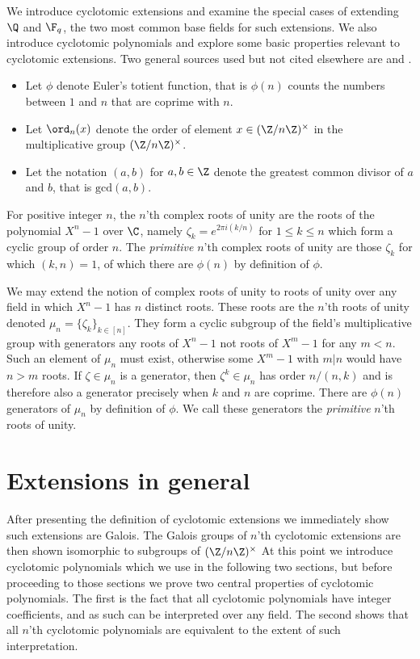 
We introduce cyclotomic extensions and examine the special cases of extending $\Q$ and $\F_q$, the two most common base fields for such extensions.
We also introduce cyclotomic polynomials and explore some basic properties relevant to cyclotomic extensions.
Two general sources used but not cited elsewhere are \cite{Mor96} and \cite{Conrad}.

\begin{itemize}
    \item
    Let $\phi$ denote Euler's totient function, that is $\phi(n)$ counts the numbers between $1$ and $n$ that are coprime with $n$.
    \item
    Let $\ord_n(x)$ denote the order of element $x\in(\Z/n\Z)^\times$ in the multiplicative group $(\Z/n\Z)^\times$.
    \item
    Let the notation $(a,b)$ for $a,b\in\Z$ denote the greatest common divisor of $a$ and $b$, that is $\text{gcd}(a,b)$.
\end{itemize}

For positive integer $n$, the $n$'th complex roots of unity are the roots of the polynomial $X^n-1$ over $\C$, namely $\zeta_k = e^{2\pi i(k/n)}$ for $1\leq k\leq n$ which form a cyclic group of order $n$.
The \emph{primitive} $n$'th complex roots of unity are those $\zeta_k$ for which $(k,n)=1$, of which there are $\phi(n)$ by definition of $\phi$.

We may extend the notion of complex roots of unity to roots of unity over any field in which $X^n-1$ has $n$ distinct roots.
These roots are the  $n$'th roots of unity denoted $\mu_n=\{\zeta_k\}_{k\in[n]}$.
They form a cyclic subgroup of the field's multiplicative group with generators any roots of $X^n-1$ not roots of $X^m-1$ for any $m<n$.
Such an element of $\mu_n$ must exist, otherwise some $X^m-1$ with $m|n$ would have $n>m$ roots.
If $\zeta\in\mu_n$ is a generator, then $\zeta^k\in\mu_n$ has order $n/(n,k)$ and is therefore also a generator precisely when $k$ and $n$ are coprime.
There are $\phi(n)$ generators of $\mu_n$ by definition of $\phi$.
We call these generators the \emph{primitive} $n$'th roots of unity.


\section{Extensions in general}

After presenting the definition of cyclotomic extensions we immediately show such extensions are Galois.
The Galois groups of $n$'th cyclotomic extensions are then shown isomorphic to subgroups of $(\Z/n\Z)^\times$
At this point we introduce cyclotomic polynomials which we use in the following two sections, but before proceeding to those sections we prove two central properties of cyclotomic polynomials.
The first is the fact that all cyclotomic polynomials have integer coefficients, and as such can be interpreted over any field.
The second shows that all $n$'th cyclotomic polynomials are equivalent to the extent of such interpretation.

